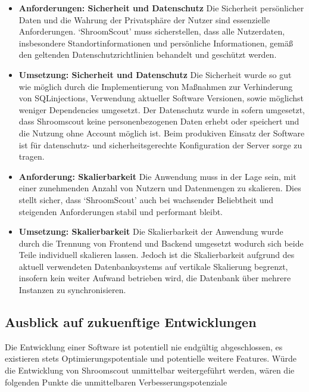 \documentclass[../main.tex]{subfiles}
\begin{document}
\begin{itemize}
	\item \textbf{Anforderungen: Sicherheit und Datenschutz}
	      Die Sicherheit persönlicher Daten und die Wahrung der Privatsphäre der Nutzer sind essenzielle Anforderungen. `ShroomScout'
	      muss sicherstellen, dass alle Nutzerdaten, insbesondere Standortinformationen und persönliche Informationen, gemäß den
	      geltenden Datenschutzrichtlinien behandelt und geschützt werden.

    \item \textbf{Umsetzung: Sicherheit und Datenschutz}
          Die Sicherheit wurde so gut wie möglich durch die Implementierung von Maßnahmen zur Verhinderung von SQLinjections, Verwendung aktueller Software Versionen, sowie möglichst weniger Dependencies umgesetzt.
          Der Datenschutz wurde in sofern umgesetzt, dass Shroomscout keine personenbezogenen Daten erhebt oder speichert und die Nutzung ohne Account möglich ist.
          Beim produkiven Einsatz der Software ist für datenschutz- und sicherheitsgerechte Konfiguration der Server sorge zu tragen.

	\item \textbf{Anforderung: Skalierbarkeit}
	      Die Anwendung muss in der Lage sein, mit einer zunehmenden Anzahl von Nutzern und Datenmengen zu skalieren. Dies stellt
	      sicher, dass `ShroomScout' auch bei wachsender Beliebtheit und steigenden Anforderungen stabil und performant bleibt.
    
    \item \textbf{Umsetzung: Skalierbarkeit}
          Die Skalierbarkeit der Anwendung wurde durch die Trennung von Frontend und Backend umgesetzt wodurch sich beide Teile individuell skalieren lassen.
          Jedoch ist die Skalierbarkeit aufgrund des aktuell verwendeten Datenbanksystems auf vertikale Skalierung begrenzt, insofern kein weiter Aufwand betrieben wird,
          die Datenbank über mehrere Instanzen zu synchronisieren.
\end{itemize}

\subsection{Ausblick auf zukuenftige Entwicklungen}
Die Entwicklung einer Software ist potentiell nie endgültig abgeschlossen, es existieren stets Optimierungspotentiale und potentielle weitere Features.
Würde die Entwicklung von Shroomscout unmittelbar weitergeführt werden, wären die folgenden Punkte die unmittelbaren Verbesserungspotenziale
\end{document}
